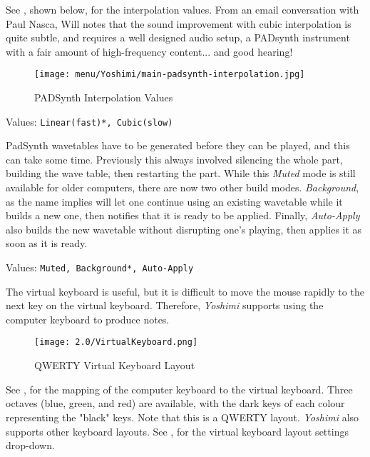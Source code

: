    See , shown below,
   for the interpolation values.
   From an email conversation with Paul Nasca, Will notes that
   the sound improvement with cubic interpolation is quite subtle, and requires
   a well designed audio setup, a PADsynth instrument with a fair amount of
   high-frequency content... and good hearing!

\begin{figure}[H]
   \centering
   \texttt{[image: menu/Yoshimi/main-padsynth-interpolation.jpg]}
   \caption[PADSynth Interpolation]{PADSynth Interpolation Values}
   \label{fig:padsynth_interpolation}
\end{figure}

   Values: \texttt{Linear(fast)*, Cubic(slow)}


   PadSynth wavetables have to be generated before they can be played, and this can take
   some time. Previously this always involved silencing the whole part, building the
   wave table, then restarting the part. While this \textsl{Muted} mode is still
   available for older computers, there are now two other build modes.
   \textsl{Background}, as the name implies will let one continue using an existing
   wavetable while it builds a new one, then notifies that it is ready to be applied.
   Finally, \textsl{Auto-Apply} also builds the new wavetable without disrupting one's
   playing, then applies it as soon as it is ready.

   Values: \texttt{Muted, Background*, Auto-Apply}

   The virtual keyboard is useful, but it is difficult to move the mouse
   rapidly to the next key on the virtual keyboard.
   Therefore, \textsl{Yoshimi} supports using the computer keyboard
   to produce notes.

\begin{figure}[H]
   \centering
   \texttt{[image: 2.0/VirtualKeyboard.png]}
   \caption{QWERTY Virtual Keyboard Layout}
   \label{fig:qwerty_virtual_keyboard}
\end{figure}

   See ,
   for the mapping of the computer keyboard to the
   virtual keyboard.
   Three octaves (blue, green, and red) are available, with the dark keys of
   each colour representing the "black" keys.
   Note that this is a QWERTY layout.
   \textsl{Yoshimi} also supports other keyboard layouts.
   See ,
   for the virtual keyboard layout settings drop-down.

